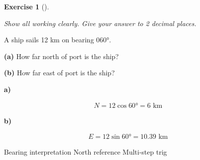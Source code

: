 \documentclass[
  letterpaper,
  DIV=11,
  numbers=noendperiod]{scrreprt}
\theoremstyle{definition}
\newtheorem{exercise}{Exercise}[chapter]
\theoremstyle{remark}
\begin{document}
\begin{exercise}[]\protect\hypertarget{exr-trig-23}{}\label{exr-trig-23}

\emph{Show all working clearly. Give your answer to 2 decimal places.}

A ship sails 12 km on bearing 060°.

\textbf{(a)} How far north of port is the ship?

\textbf{(b)} How far east of port is the ship?

\begin{tcolorbox}[enhanced jigsaw, opacitybacktitle=0.6, coltitle=black, arc=.35mm, colframe=quarto-callout-tip-color-frame, colback=white, bottomrule=.15mm, left=2mm, colbacktitle=quarto-callout-tip-color!10!white, titlerule=0mm, opacityback=0, title=\textcolor{quarto-callout-tip-color}{\faLightbulb}\hspace{0.5em}{🔍 View Solution}, leftrule=.75mm, breakable, rightrule=.15mm, bottomtitle=1mm, toptitle=1mm, toprule=.15mm]

\textbf{a)}

\[
\begin{aligned}
N = 12 \cos 60° = 6 \text{ km}
\end{aligned}
\]

\textbf{b)}

\[
\begin{aligned}
E = 12 \sin 60° = 10.39 \text{ km}
\end{aligned}
\]

\end{tcolorbox}

{Bearing interpretation} {North reference} {Multi-step trig}

\end{exercise}
\end{document}
